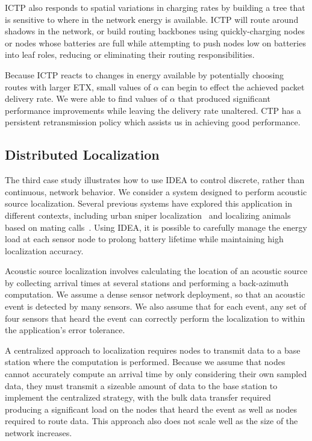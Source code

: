 ICTP also responds to spatial variations in charging rates by building a tree
that is sensitive to where in the network energy is available. ICTP will
route around shadows in the network, or build routing backbones using
quickly-charging nodes or nodes whose batteries are full while attempting to
push nodes low on batteries into leaf roles, reducing or eliminating their
routing responsibilities.

Because ICTP reacts to changes in energy available by potentially choosing
routes with larger ETX, small values of $\alpha$ can begin to effect the
achieved packet delivery rate. We were able to find values of $\alpha$ that
produced significant performance improvements while leaving the delivery rate
unaltered. CTP has a persistent retransmission policy which assists us in
achieving good performance.

\subsection{Distributed Localization}

The third case study illustrates how to use IDEA to control discrete, rather
than continuous, network behavior. We consider a system designed to perform
acoustic source localization. Several previous systems have explored this
application in different contexts, including urban sniper
localization~\cite{shooter-localization} and localizing animals based on
mating calls~\cite{girod-marmots}. Using IDEA, it is possible to carefully
manage the energy load at each sensor node to prolong battery lifetime while
maintaining high localization accuracy.

Acoustic source localization involves calculating the location of an acoustic
source by collecting arrival times at several stations and performing a
back-azimuth computation. We assume a dense sensor network deployment, so
that an acoustic event is detected by many sensors. We also assume that for
each event, any set of four sensors that heard the event can correctly
perform the localization to within the application's error tolerance. 

A centralized approach to localization requires nodes to transmit data to a
base station where the computation is performed. Because we assume that nodes
cannot accurately compute an arrival time by only considering their own
sampled data, they must transmit a sizeable amount of data to the base
station to implement the centralized strategy, with the bulk data transfer
required producing a significant load on the nodes that heard the event as
well as nodes required to route data. This approach also does not scale well
as the size of the network increases.

